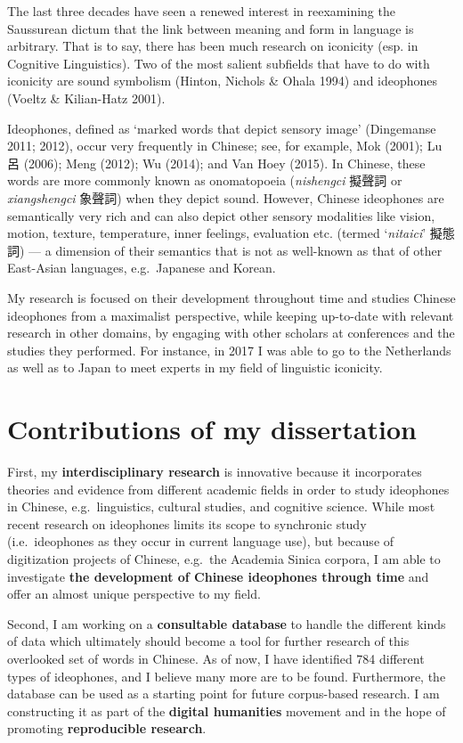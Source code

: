 \documentclass[12pt,]{article}
\theoremstyle{definition}
\theoremstyle{definition}
\theoremstyle{definition}
\theoremstyle{remark}
\begin{document}
The last three decades have seen a renewed interest in reexamining the
Saussurean dictum that the link between meaning and form in language is
arbitrary. That is to say, there has been much research on iconicity
(esp. in Cognitive Linguistics). Two of the most salient subfields that
have to do with iconicity are sound symbolism (Hinton, Nichols \& Ohala
1994) and ideophones (Voeltz \& Kilian-Hatz 2001).

Ideophones, defined as `marked words that depict sensory image'
(Dingemanse 2011; 2012), occur very frequently in Chinese; see, for
example, Mok (2001); Lu 呂 (2006); Meng (2012); Wu (2014); and Van Hoey
(2015). In Chinese, these words are more commonly known as onomatopoeia
(\emph{nishengci} 擬聲詞 or \emph{xiangshengci} 象聲詞) when they depict
sound. However, Chinese ideophones are semantically very rich and can
also depict other sensory modalities like vision, motion, texture,
temperature, inner feelings, evaluation etc. (termed `\emph{nitaici}'
擬態詞) --- a dimension of their semantics that is not as well-known as
that of other East-Asian languages, e.g.~Japanese and Korean.

My research is focused on their development throughout time and studies
Chinese ideophones from a maximalist perspective, while keeping
up-to-date with relevant research in other domains, by engaging with
other scholars at conferences and the studies they performed. For
instance, in 2017 I was able to go to the Netherlands as well as to
Japan to meet experts in my field of linguistic iconicity.

\section{Contributions of my
dissertation}\label{contributions-of-my-dissertation}

First, my \textbf{interdisciplinary research} is innovative because it
incorporates theories and evidence from different academic fields in
order to study ideophones in Chinese, e.g.~linguistics, cultural
studies, and cognitive science. While most recent research on ideophones
limits its scope to synchronic study (i.e.~ideophones as they occur in
current language use), but because of digitization projects of Chinese,
e.g.~the Academia Sinica corpora, I am able to investigate \textbf{the
development of Chinese ideophones through time} and offer an almost
unique perspective to my field.

Second, I am working on a \textbf{consultable database} to handle the
different kinds of data which ultimately should become a tool for
further research of this overlooked set of words in Chinese. As of now,
I have identified 784 different types of ideophones, and I believe many
more are to be found. Furthermore, the database can be used as a
starting point for future corpus-based research. I am constructing it as
part of the \textbf{digital humanities} movement and in the hope of
promoting \textbf{reproducible research}.
\end{document}
